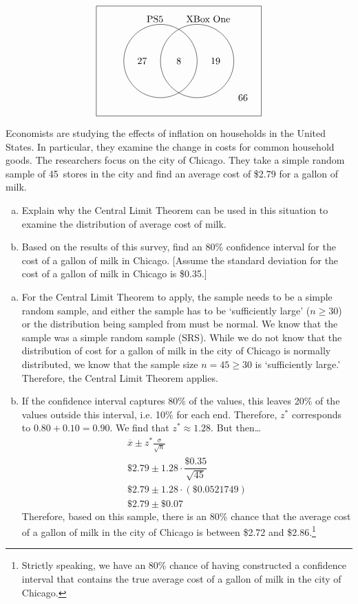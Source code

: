 \documentclass[12pt,letterpaper]{exam}
\begin{document}
\begin{questions}
	\[
	\begin{tikzpicture}[scale=0.67]
	\draw (0,0) rectangle (9,6);
	\draw (3.5,3) circle (2);
	\draw (5.5,3) circle (2);
	
	\node at (3.2,5.3) {PS5};
	\node at (6.1,5.3) {XBox One}; 
	
	\node at (2.5,3) {27};
	\node at (4.5,3) {8};
	\node at (6.5,3) {19};
	\node at (8,1) {66};
	\end{tikzpicture}
	\]



\newpage
\question[10] Economists are studying the effects of inflation on households in the United States. In particular, they examine the change in costs for common household goods. The researchers focus on the city of Chicago. They take a simple random sample of 45~stores in the city and find an average cost of \$2.79 for a gallon of milk. 
\begin{enumerate}[(a)]
\item Explain why the Central Limit Theorem can be used in this situation to examine the distribution of average cost of milk. 
\item Based on the results of this survey, find an 80\% confidence interval for the cost of a gallon of milk in Chicago. [Assume the standard deviation for the cost of a gallon of milk in Chicago is \$0.35.]
\end{enumerate} \pspace

\sol 
\begin{enumerate}[(a)]
\item For the Central Limit Theorem to apply, the sample needs to be a simple random sample, and either the sample has to be `sufficiently large' ($n \geq 30$) or the distribution being sampled from must be normal. We know that the sample was a simple random sample (SRS). While we do not know that the distribution of cost for a gallon of milk in the city of Chicago is normally distributed, we know that the sample size $n= 45 \geq 30$ is `sufficiently large.' Therefore, the Central Limit Theorem applies. \pspace

\item If the confidence interval captures 80\% of the values, this leaves 20\% of the values outside this interval, i.e. 10\% for each end. Therefore, $z^*$ corresponds to $0.80 + 0.10= 0.90$. We find that $z^* \approx 1.28$. But then\dots
	\[
	\begin{gathered}
	\overline{x} \pm z^* \frac{\sigma}{\sqrt{n}} \\[0.3cm]
	\$2.79 \pm 1.28 \cdot \dfrac{\$0.35}{\sqrt{45}} \\[0.3cm]
	\$2.79 \pm 1.28 \cdot (\$0.0521749) \\[0.3cm]
	\$2.79 \pm \$0.07
	\end{gathered}
	\] \pspace
Therefore, based on this sample, there is an 80\% chance that the average cost of a gallon of milk in the city of Chicago is between \$2.72 and \$2.86.\footnote{Strictly speaking, we have an 80\% chance of having constructed a confidence interval that contains the true average cost of a gallon of milk in the city of Chicago.}
\end{enumerate}


\end{questions}
\end{document}
